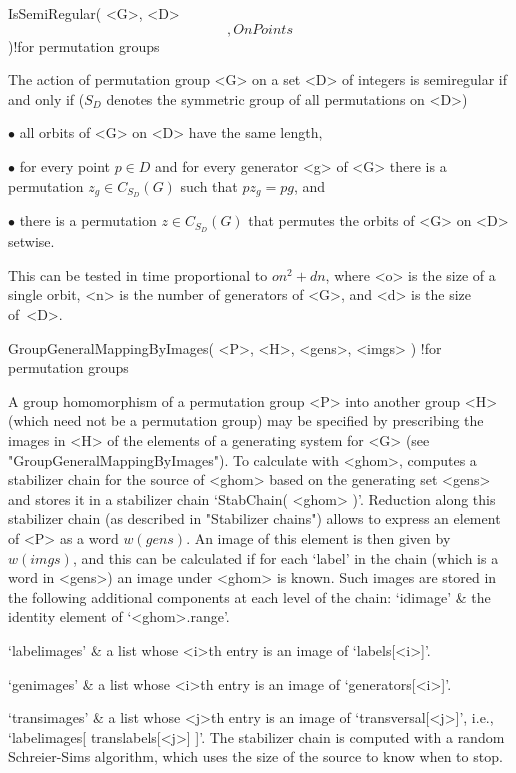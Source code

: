 \>IsSemiRegular( <G>, <D> \[, OnPoints \] )!{for permutation groups}

The   action of  permutation  group <G>   on  a  set <D> of   integers is
semiregular if  and  only if  ($S_D$ denotes the  symmetric  group of all
permutations on <D>)
{\parindent\manindent
\item{$\bullet$} all orbits of <G> on <D> have the same length,
\item{$\bullet$} for every point $p\in D$ and for every generator <g> of
    <G> there is a permutation $z_g\in C_{S_D}(G)$ such that $pz_g = pg$,
    and
\item{$\bullet$} there is  a permutation $z\in  C_{S_D}(G)$ that permutes
    the orbits of <G> on <D> setwise.\par}

This can  be tested in time  proportional to $o n^2 +  d n$, where <o> is
the size of a single  orbit, <n> is the number  of generators of <G>, and
<d> is the size of~<D>.


\>GroupGeneralMappingByImages( <P>, <H>, <gens>, <imgs> )%
  !{for permutation groups}

A group homomorphism  of a permutation group  <P> into  another group <H>
(which need not be  a permutation group)  may be specified by prescribing
the images in <H>  of the elements of  a  generating system for  <G> (see
"GroupGeneralMappingByImages"). To calculate with <ghom>, {\GAP} computes
a stabilizer chain for  the source of <ghom> based  on the generating set
<gens> and  stores it   in  a  stabilizer chain `StabChain(   <ghom>  )'.
Reduction along this stabilizer    chain  (as described  in   "Stabilizer
chains") allows to  express an element  of <P>  as  a word  $w(gens)$. An
image of  this  element  is then given   by  $w(imgs)$, and  this can  be
calculated if for each `label'  in the chain  (which is a word in <gens>)
an image under  <ghom> is known. Such  images are stored in the following
additional components at each level of the chain:
\beginitems
`idimage' &
        the identity element of `<ghom>.range'.

`labelimages' &
        a list whose <i>th entry is an image of `labels[<i>]'.

`genimages' &
        a list whose <i>th entry is an image of `generators[<i>]'.

`transimages' &
        a list whose <j>th entry is an image of `transversal[<j>]', i.e.,
        `labelimages[ translabels[<j>] ]'.
\enditems
The stabilizer  chain is computed with  a random Schreier-Sims algorithm,
which uses the size of the source to know when to stop.

